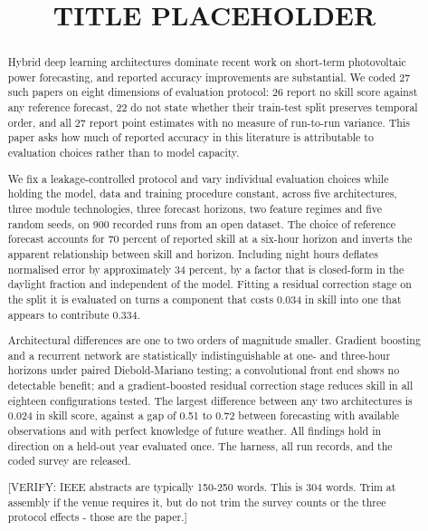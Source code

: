 \documentclass[conference]{IEEEtran}
\begin{document}
\title{TITLE PLACEHOLDER}

\author{
}

\maketitle

\begin{abstract}
Hybrid deep learning architectures dominate recent work on short-term
photovoltaic power forecasting, and reported accuracy improvements are
substantial. We coded 27 such papers on eight dimensions of evaluation
protocol: 26 report no skill score against any reference forecast, 22 do
not state whether their train-test split preserves temporal order, and
all 27 report point estimates with no measure of run-to-run variance.
This paper asks how much of reported accuracy in this literature is
attributable to evaluation choices rather than to model capacity.

We fix a leakage-controlled protocol and vary individual evaluation
choices while holding the model, data and training procedure constant,
across five architectures, three module technologies, three forecast
horizons, two feature regimes and five random seeds, on 900 recorded
runs from an open dataset. The choice of reference forecast accounts for
70 percent of reported skill at a six-hour horizon and inverts the
apparent relationship between skill and horizon. Including night hours
deflates normalised error by approximately 34 percent, by a factor that
is closed-form in the daylight fraction and independent of the model.
Fitting a residual correction stage on the split it is evaluated on
turns a component that costs 0.034 in skill into one that appears to
contribute 0.334.

Architectural differences are one to two orders of magnitude smaller.
Gradient boosting and a recurrent network are statistically
indistinguishable at one- and three-hour horizons under paired
Diebold-Mariano testing; a convolutional front end shows no detectable
benefit; and a gradient-boosted residual correction stage reduces skill
in all eighteen configurations tested. The largest difference between
any two architectures is 0.024 in skill score, against a gap of 0.51 to
0.72 between forecasting with available observations and with perfect
knowledge of future weather. All findings hold in direction on a
held-out year evaluated once. The harness, all run records, and the
coded survey are released.

[VERIFY: IEEE abstracts are typically 150-250 words. This is 304 words.
Trim at assembly if the venue requires it, but do not
trim the survey counts or the three protocol effects - those are the
paper.]
\end{abstract}
\end{document}
